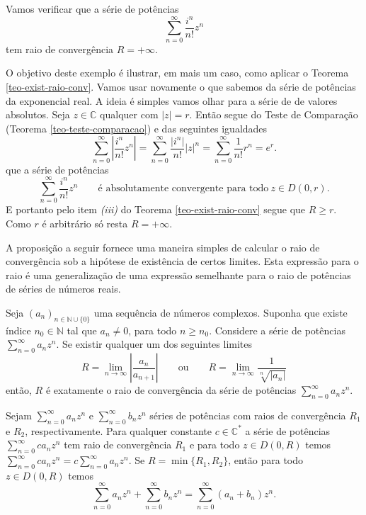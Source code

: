 \begin{exemplo}
Vamos verificar que a série de potências 
\[
\sum_{n=0}^{\infty} \frac{i^{n}}{n!}z^{n}
\]
tem raio de convergência $R=+\infty$. 

O objetivo deste exemplo é ilustrar, em mais um caso, 
como aplicar o Teorema \ref{teo-exist-raio-conv}.
Vamos usar novamente o que sabemos da série de potências da exponencial real.
A ideia é simples vamos olhar para a série de de valores absolutos.
Seja $z\in\mathbb{C}$ qualquer com $|z|=r$. Então segue do 
Teste de Comparação (Teorema \ref{teo-teste-comparacao}) e das seguintes igualdades
\[
\sum_{n=0}^{\infty}\left|  \frac{i^{n}}{n!}z^{n} \right|
=
\sum_{n=0}^{\infty} \frac{|i^{n}|}{n!}|z|^{n}
=
\sum_{n=0}^{\infty} \frac{1}{n!}r^{n}
=
e^{r}.
\]
que a série de potências 
\[
\sum_{n=0}^{\infty} \frac{i^{n}}{n!}z^{n}
\qquad \text{é absolutamente convergente para todo}\ z\in D(0,r).
\]
E portanto pelo item \textit{(iii)} do Teorema \ref{teo-exist-raio-conv}
segue que $R\geqslant r$. Como $r$ é arbitrário só resta $R=+\infty$.
\end{exemplo}


A proposição a seguir fornece uma maneira simples de calcular o
raio de convergência sob a hipótese de existência de certos limites.
Esta expressão para o raio é uma generalização de uma expressão semelhante
para o raio de potências de séries de números reais.

\begin{proposicao}
\label{prop-raio-raiz-n-razao}
Seja $(a_n)_{n\in\mathbb{N}\cup\{0\}}$ uma sequência de números complexos.
Suponha que existe índice $n_0\in\mathbb{N}$ tal que $a_n\neq 0$, 
para todo $n\geqslant n_0$. Considere a série
de potências $\sum_{n=0}^{\infty}a_nz^n$. Se existir
qualquer um dos seguintes limites
\[
R = \lim_{n\to\infty} \left|\frac{a_n}{a_{n+1}}\right|
\qquad \text{ou}\qquad
R = \lim_{n\to\infty} \frac{1}{\displaystyle \sqrt[n]{|a_n|}}
\]
então, $R$ é exatamente o raio de convergência
da série de potências $\sum_{n=0}^{\infty}a_nz^n$.
\end{proposicao} 



\begin{proposicao}
Sejam $\sum_{n=0}^{\infty}a_nz^n$ e $\sum_{n=0}^{\infty}b_nz^n$
séries de potências com raios de convergência $R_1$ e $R_2$,
respectivamente. Para qualquer constante $c\in\mathbb{C}^{*}$ 
a série de potências $\sum_{n=0}^{\infty}ca_nz^n$ tem raio 
de convergência $R_1$ e para todo $z\in D(0,R)$ temos 
$\sum_{n=0}^{\infty}ca_nz^n =c\sum_{n=0}^{\infty}a_nz^n$.
Se $R=\min\{R_1,R_2\}$, então para todo $z\in D(0,R)$ temos 
\[
\sum_{n=0}^{\infty}a_nz^n  + \sum_{n=0}^{\infty}b_nz^n = 
\sum_{n=0}^{\infty}(a_n+b_n)z^n.
\]
\end{proposicao}

